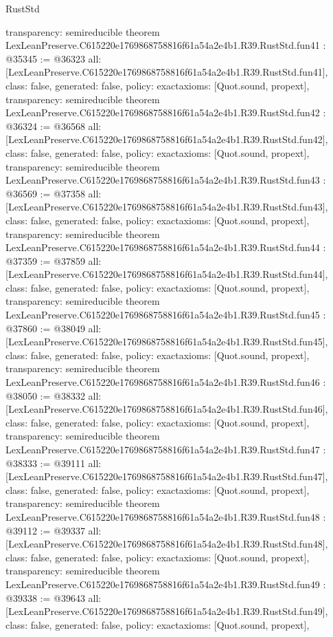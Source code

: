\begin{lexlean}{RustStd}
\begin{coremodule}
{  transparency: semireducible
}
theorem LexLeanPreserve.C615220e1769868758816f61a54a2e4b1.R39.RustStd.fun41 : @35345 := @36323 {
  all: [LexLeanPreserve.C615220e1769868758816f61a54a2e4b1.R39.RustStd.fun41],
  class: false,
  generated: false,
  policy: exact{axioms: [Quot.sound, propext]},
  transparency: semireducible
}
theorem LexLeanPreserve.C615220e1769868758816f61a54a2e4b1.R39.RustStd.fun42 : @36324 := @36568 {
  all: [LexLeanPreserve.C615220e1769868758816f61a54a2e4b1.R39.RustStd.fun42],
  class: false,
  generated: false,
  policy: exact{axioms: [Quot.sound, propext]},
  transparency: semireducible
}
theorem LexLeanPreserve.C615220e1769868758816f61a54a2e4b1.R39.RustStd.fun43 : @36569 := @37358 {
  all: [LexLeanPreserve.C615220e1769868758816f61a54a2e4b1.R39.RustStd.fun43],
  class: false,
  generated: false,
  policy: exact{axioms: [Quot.sound, propext]},
  transparency: semireducible
}
theorem LexLeanPreserve.C615220e1769868758816f61a54a2e4b1.R39.RustStd.fun44 : @37359 := @37859 {
  all: [LexLeanPreserve.C615220e1769868758816f61a54a2e4b1.R39.RustStd.fun44],
  class: false,
  generated: false,
  policy: exact{axioms: [Quot.sound, propext]},
  transparency: semireducible
}
theorem LexLeanPreserve.C615220e1769868758816f61a54a2e4b1.R39.RustStd.fun45 : @37860 := @38049 {
  all: [LexLeanPreserve.C615220e1769868758816f61a54a2e4b1.R39.RustStd.fun45],
  class: false,
  generated: false,
  policy: exact{axioms: [Quot.sound, propext]},
  transparency: semireducible
}
theorem LexLeanPreserve.C615220e1769868758816f61a54a2e4b1.R39.RustStd.fun46 : @38050 := @38332 {
  all: [LexLeanPreserve.C615220e1769868758816f61a54a2e4b1.R39.RustStd.fun46],
  class: false,
  generated: false,
  policy: exact{axioms: [Quot.sound, propext]},
  transparency: semireducible
}
theorem LexLeanPreserve.C615220e1769868758816f61a54a2e4b1.R39.RustStd.fun47 : @38333 := @39111 {
  all: [LexLeanPreserve.C615220e1769868758816f61a54a2e4b1.R39.RustStd.fun47],
  class: false,
  generated: false,
  policy: exact{axioms: [Quot.sound, propext]},
  transparency: semireducible
}
theorem LexLeanPreserve.C615220e1769868758816f61a54a2e4b1.R39.RustStd.fun48 : @39112 := @39337 {
  all: [LexLeanPreserve.C615220e1769868758816f61a54a2e4b1.R39.RustStd.fun48],
  class: false,
  generated: false,
  policy: exact{axioms: [Quot.sound, propext]},
  transparency: semireducible
}
theorem LexLeanPreserve.C615220e1769868758816f61a54a2e4b1.R39.RustStd.fun49 : @39338 := @39643 {
  all: [LexLeanPreserve.C615220e1769868758816f61a54a2e4b1.R39.RustStd.fun49],
  class: false,
  generated: false,
  policy: exact{axioms: [Quot.sound, propext]},
}
\end{coremodule}
\end{lexlean}
